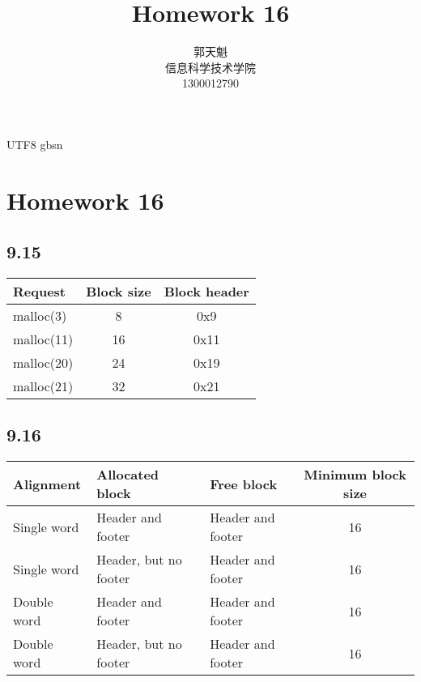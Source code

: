 \documentclass {article}
\begin{document}
  \begin {CJK*} {UTF8} {gbsn}
    \title {\textbf {\Huge Homework 16}}
		\author {郭天魁 \\ 信息科学技术学院 \\ 1300012790}

		\maketitle
		
		\section{Homework 16}
			\subsection{9.15}
				\begin{table}[h]
					\begin{tabular}{lcc}
					Request    & Block size & Block header \\ \hline
					malloc(3)  & 8          & 0x9          \\
					malloc(11) & 16         & 0x11         \\
					malloc(20) & 24         & 0x19         \\
					malloc(21) & 32         & 0x21        
					\end{tabular}
				\end{table}

			\subsection{9.16}
				\begin{table}[h]
					\begin{tabular}{lllc}
					Alignment   & Allocated block       & Free block        & Minimum block size \\ \hline
					Single word & Header and footer     & Header and footer & 16                 \\
					Single word & Header, but no footer & Header and footer & 16                 \\
					Double word & Header and footer     & Header and footer & 16                 \\
					Double word & Header, but no footer & Header and footer & 16                
					\end{tabular}
				\end{table}


\end{CJK*}
\end{document}
